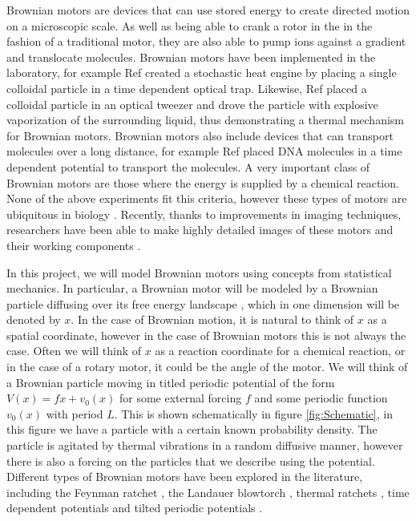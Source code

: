 Brownian motors are devices that can use stored energy to create directed motion on a microscopic scale. As well as being able to crank a rotor in the in the fashion of a traditional motor, they are also able to pump ions against a gradient and translocate molecules. Brownian motors have been implemented in the laboratory, for example Ref \cite{BlickleBechinger2011} created a stochastic heat engine by placing a single colloidal particle in a time dependent optical trap. Likewise, Ref \cite{Pedro2014} placed a colloidal particle in an optical tweezer and drove the particle with explosive vaporization of the surrounding liquid, thus demonstrating a thermal mechanism for Brownian motors. Brownian motors also include devices that can transport molecules over a long distance, for example Ref \cite{JoelBader1999} placed DNA molecules in a time dependent potential to transport the molecules. A very important class of Brownian motors are those where the energy is supplied by a chemical reaction. None of the above experiments fit this criteria, however these types of motors are ubiquitous in biology \cite{PhillipsQuakeMay2006, Magnasco1994}. Recently, thanks to improvements in imaging techniques, researchers have been able to make highly detailed images of these motors and their working components \cite{YiWeiChang2016}.

In this project, we will model Brownian motors using concepts from statistical mechanics. In particular, a Brownian motor will be modeled by a Brownian particle diffusing over its free energy landscape \cite{Reimann2001}, which in one dimension will be denoted by $x$. In the case of Brownian motion, it is natural to think of $x$ as a spatial coordinate, however in the case of Brownian motors this is not always the case. Often we will think of $x$ as a reaction coordinate for a chemical reaction, or in the case of a rotary motor, it could be the angle of the motor. We will think of a Brownian particle moving in titled periodic potential of the form $V(x) = f x + v_0(x)$ for some external forcing $f$ and some periodic function $v_0(x)$ with period $L$. This is shown schematically in figure \ref{fig:Schematic}, in this figure we have a particle with a certain known probability density. The particle is agitated by thermal vibrations in a random diffusive manner, however there is also a forcing on the particles that we describe using the potential. Different types of Brownian motors have been explored in the literature, including the Feynman ratchet \cite{Feynman1963}, the Landauer blowtorch \cite{Landauer1988}, thermal ratchets \cite{Pedro2014}, time dependent potentials \cite{JoelBader1999,BlickleBechinger2011} and tilted periodic potentials \cite{Leibler1993,Magnasco1994}.

